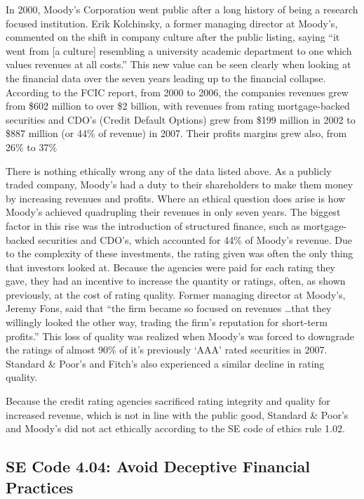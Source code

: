 \documentclass[11pt]{article}
\begin{document}
\begin{multicols}{2}
In 2000, Moody's Corporation went public after a long history of being a research focused institution.  Erik Kolchinsky, a former managing director at Moody's, commented on the shift in company culture after the public listing, saying ``it went from [a culture] resembling a university academic department to one which values revenues at all costs.'' \cite[p.207]{govtReport}  This new value can be seen clearly when looking at the financial data over the seven years leading up to the financial collapse.  According to the FCIC report, from 2000 to 2006, the companies revenues grew from \$602 million to over \$2 billion, with revenues from rating mortgage-backed securities and CDO's (Credit Default Options) grew from \$199 million in 2002 to \$887 million (or 44\% of revenue) in 2007. Their profits margins grew also, from 26\% to 37\% \cite[p.149]{govtReport}

There is nothing ethically wrong any of the data listed above.  As a publicly traded company, Moody's had a duty to their shareholders to make them money by increasing revenues and profits.  Where an ethical question does arise is how Moody's achieved quadrupling their revenues in only seven years.  The biggest factor in this rise was the introduction of structured finance, such as mortgage-backed securities and CDO's, which accounted for 44\% of Moody's revenue.  Due to the complexity of these investments, the rating given was often the only thing that investors looked at.  Because the agencies were paid for each rating they gave, they had an incentive to increase the quantity or ratings, often, as shown previously, at the cost of rating quality.  Former managing director at Moody's, Jeremy Fons, said that ``the firm became so focused on revenues \ldots that they willingly looked the other way, trading the firm's reputation for short-term profits.'' \cite[p.207]{govtReport} This loss of quality was realized when Moody's was forced to downgrade the ratings of almost 90\% of it's previously `AAA' rated securities in 2007.  Standard \& Poor's and Fitch's also experienced a similar decline in rating quality. \cite[p.212]{govtReport} 

Because the credit rating agencies sacrificed rating integrity and quality for increased revenue, which is not in line with the public good, Standard \& Poor's and Moody's did not act ethically according to the SE code of ethics rule 1.02.


\subsection{SE Code 4.04: Avoid Deceptive Financial Practices}


\end{multicols}
\end{document}
